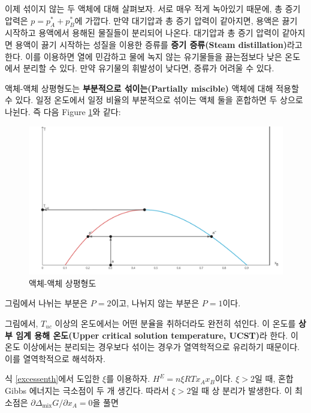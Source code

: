         \par 이제 섞이지 않는 두 액체에 대해 살펴보자. 서로 매우 적게 녹아있기 때문에, 총 증기 압력은 $p=p_A^\ast + p_B^\ast$에 가깝다. 
        만약 대기압과 총 증기 압력이 같아지면, 용액은 끓기 시작하고 용액에서 용해된 물질들이 분리되어 나온다. 
        대기압과 총 증기 압력이 같아지면 용액이 끓기 시작하는 성질을 이용한 증류를 \textbf{증기 증류(Steam distillation)}라고 한다. 
        이를 이용하면 열에 민감하고 물에 녹지 않는 유기물들을 끓는점보다 낮은 온도에서 분리할 수 있다. 만약 유기물의 휘발성이 낮다면, 
        증류가 어려울 수 있다.
        \par 액체-액체 상평형도는 \textbf{부분적으로 섞이는(Partially miscible)} 액체에 대해 적용할 수 있다. 일정 온도에서 일정 비율의 
        부분적으로 섞이는 액체 둘을 혼합하면 두 상으로 나뉜다. 즉 다음 Figure \ref{f12}와 같다:\\
        \begin{figure}[H]
            \centering
            \includegraphics[scale=12]{Images/lldiaguc}
            \caption{액체-액체 상평형도}\label{f12}
        \end{figure}
        그림에서 나뉘는 부분은 $P=2$이고, 나뉘지 않는 부분은 $P=1$이다.
        \par 그림에서, $T_{uc}$ 이상의 온도에서는 어떤 분율을 취하더라도 완전히 섞인다. 이 온도를 
        \textbf{상부 임계 용해 온도(Upper critical solution temperature, UCST)}라 한다. 이 온도 이상에서는 분리되는 경우보다 
        섞이는 경우가 열역학적으로 유리하기 때문이다. 이를 열역학적으로 해석하자. 
        \par 식 \ref{excessenth}에서 도입한 $\xi$를 이용하자. $H^E = n\xi RTx_A x_B$이다. $\xi>2$일 때, 혼합 Gibbs 에너지는 극소점이 
        두 개 생긴다. 따라서 $\xi>2$일 때 상 분리가 발생한다. 이 최소점은 $\partial \Delta_\mathrm{mix}G/\partial x_A = 0$을 풀면 
